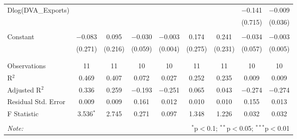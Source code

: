 \begin{table}[!htbp]
\begin{tabular}{@{\extracolsep{5pt}}lcccccccc}
 Dlog(DVA\_Exports) &  &  &  &  &  &  & $-$0.141 & $-$0.009 \\ 
  &  &  &  &  &  &  & (0.715) & (0.036) \\ 
  & & & & & & & & \\ 
 Constant & $-$0.083 & 0.095 & $-$0.030 & $-$0.003 & 0.174 & 0.241 & $-$0.034 & $-$0.003 \\ 
  & (0.271) & (0.216) & (0.059) & (0.004) & (0.275) & (0.231) & (0.057) & (0.005) \\ 
  & & & & & & & & \\ 
\hline \\[-1.8ex] 
Observations & 11 & 11 & 10 & 10 & 11 & 11 & 10 & 10 \\ 
R$^{2}$ & 0.469 & 0.407 & 0.072 & 0.027 & 0.252 & 0.235 & 0.009 & 0.009 \\ 
Adjusted R$^{2}$ & 0.336 & 0.259 & $-$0.193 & $-$0.251 & 0.065 & 0.043 & $-$0.274 & $-$0.274 \\ 
Residual Std. Error & 0.009 & 0.009 & 0.161 & 0.012 & 0.010 & 0.010 & 0.155 & 0.013 \\ 
F Statistic & 3.536$^{*}$ & 2.745 & 0.271 & 0.097 & 1.348 & 1.226 & 0.032 & 0.032 \\ 
\hline 
\hline \\[-1.8ex] 
\textit{Note:}  & \multicolumn{8}{r}{$^{*}$p$<$0.1; $^{**}$p$<$0.05; $^{***}$p$<$0.01} \\ 
\end{tabular} 
\end{table} 
